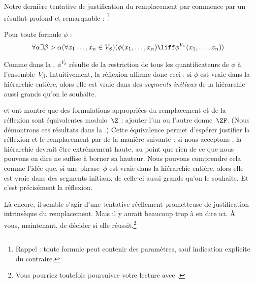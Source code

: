 \documentclass[../../../include/open-logic-section]{subfiles}
\begin{document}

Notre dernière tentative de justification du remplacement par
\stagesinex{} commence par un résultat profond et remarquable :
\footnote{Rappel : toute formule peut contenir des paramètres,
sauf indication explicite du contraire.}
\begin{thm}
Pour toute formule $\phi$ :
\[
\forall \alpha \exists \beta > \alpha (\forall x_1 \ldots, x_n \in
V_\beta)(\phi(x_1, \ldots, x_n) \liff \phi^{V_\beta}(x_1, \ldots, x_n))
\]
\end{thm}
\noindent
Comme dans la
,
$\phi^{V_\beta}$ résulte de la restriction de tous les
quantificateurs de $\phi$ à l'ensemble~$V_\beta$.
Intuitivement, la réflexion affirme donc ceci : si $\phi$
est vraie dans la hiérarchie entière, alors elle est vraie
dans des \emph{segments initiaux} de la hiérarchie aussi
grands qu'on le souhaite.

\citet{Montague1961} et \citet{Levy1960} ont montré que
des formulations appropriées du remplacement et de la
réflexion sont équivalentes modulo~$\Z$ : ajouter l'un ou
l'autre donne~$\ZF$. (Nous démontrons ces résultats
dans la .)
Cette équivalence permet d'espérer justifier la réflexion
et le remplacement par \stagesinex{} de la manière suivante :
si nous acceptons \stagesinex, la hiérarchie devrait être
extrêmement haute, au point que rien de ce que nous pouvons
en dire ne suffise à borner sa hauteur. Nous pouvons comprendre
cela comme l'idée que, si une phrase~$\phi$ est vraie dans la
hiérarchie entière, alors elle est vraie dans des segments
initiaux de celle-ci aussi grands qu'on le souhaite. Et c'est
précisément la réflexion.

Là encore, il semble s'agir d'une tentative réellement
prometteuse de justification intrinsèque du remplacement.
Mais il y aurait beaucoup trop à en dire ici. À vous,
maintenant, de décider si elle réussit.\footnote{Vous pourriez
toutefois poursuivre votre lecture avec
\citet[95--100]{Incurvati2020}.}
\end{document}
